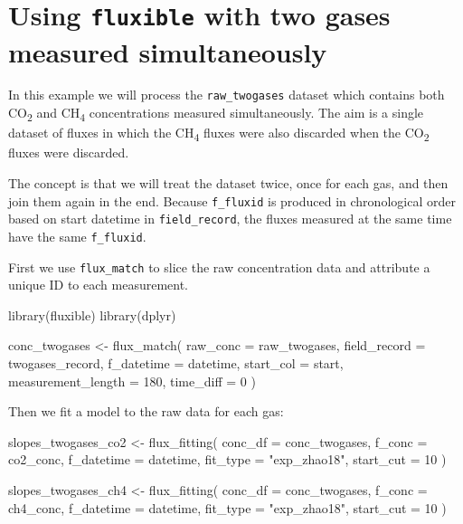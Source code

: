 \documentclass[
  letterpaper,
  DIV=11,
  numbers=noendperiod]{scrartcl}
\newenvironment{Shaded}{\begin{snugshade}}{\end{snugshade}}
\newcommand{\AttributeTok}[1]{\textcolor[rgb]{0.40,0.45,0.13}{#1}}
\newcommand{\DecValTok}[1]{\textcolor[rgb]{0.68,0.00,0.00}{#1}}
\newcommand{\FunctionTok}[1]{\textcolor[rgb]{0.28,0.35,0.67}{#1}}
\newcommand{\NormalTok}[1]{\textcolor[rgb]{0.00,0.23,0.31}{#1}}
\newcommand{\OtherTok}[1]{\textcolor[rgb]{0.00,0.23,0.31}{#1}}
\newcommand{\StringTok}[1]{\textcolor[rgb]{0.13,0.47,0.30}{#1}}
\begin{document}
\section{\texorpdfstring{Using \texttt{fluxible} with two gases measured
simultaneously}{Using fluxible with two gases measured simultaneously}}\label{sec-twogases}

In this example we will process the \texttt{raw\_twogases} dataset which
contains both CO\textsubscript{2} and CH\textsubscript{4} concentrations
measured simultaneously. The aim is a single dataset of fluxes in which
the CH\textsubscript{4} fluxes were also discarded when the
CO\textsubscript{2} fluxes were discarded.

The concept is that we will treat the dataset twice, once for each gas,
and then join them again in the end. Because \texttt{f\_fluxid} is
produced in chronological order based on start datetime in
\texttt{field\_record}, the fluxes measured at the same time have the
same \texttt{f\_fluxid}.

First we use \texttt{flux\_match} to slice the raw concentration data
and attribute a unique ID to each measurement.

\begin{Shaded}
\begin{Highlighting}[]
\FunctionTok{library}\NormalTok{(fluxible)}
\FunctionTok{library}\NormalTok{(dplyr)}

\NormalTok{conc\_twogases }\OtherTok{\textless{}{-}} \FunctionTok{flux\_match}\NormalTok{(}
  \AttributeTok{raw\_conc =}\NormalTok{ raw\_twogases,}
  \AttributeTok{field\_record =}\NormalTok{ twogases\_record,}
  \AttributeTok{f\_datetime =}\NormalTok{ datetime,}
  \AttributeTok{start\_col =}\NormalTok{ start,}
  \AttributeTok{measurement\_length =} \DecValTok{180}\NormalTok{,}
  \AttributeTok{time\_diff =} \DecValTok{0}
\NormalTok{)}
\end{Highlighting}
\end{Shaded}

Then we fit a model to the raw data for each gas:

\begin{Shaded}
\begin{Highlighting}[]
\NormalTok{slopes\_twogases\_co2 }\OtherTok{\textless{}{-}} \FunctionTok{flux\_fitting}\NormalTok{(}
  \AttributeTok{conc\_df =}\NormalTok{ conc\_twogases,}
  \AttributeTok{f\_conc =}\NormalTok{ co2\_conc,}
  \AttributeTok{f\_datetime =}\NormalTok{ datetime,}
  \AttributeTok{fit\_type =} \StringTok{"exp\_zhao18"}\NormalTok{,}
  \AttributeTok{start\_cut =} \DecValTok{10}
\NormalTok{)}

\NormalTok{slopes\_twogases\_ch4 }\OtherTok{\textless{}{-}} \FunctionTok{flux\_fitting}\NormalTok{(}
  \AttributeTok{conc\_df =}\NormalTok{ conc\_twogases,}
  \AttributeTok{f\_conc =}\NormalTok{ ch4\_conc,}
  \AttributeTok{f\_datetime =}\NormalTok{ datetime,}
  \AttributeTok{fit\_type =} \StringTok{"exp\_zhao18"}\NormalTok{,}
  \AttributeTok{start\_cut =} \DecValTok{10}
\NormalTok{)}
\end{Highlighting}
\end{Shaded}
\end{document}
